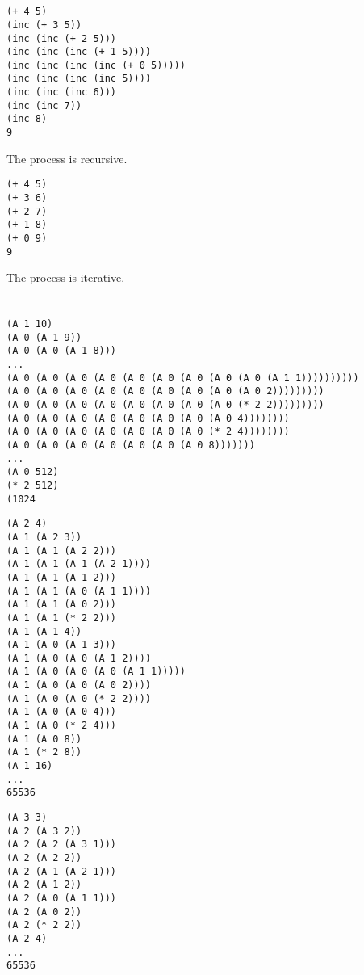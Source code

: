 \documentclass[../main.tex]{subfiles}
\begin{document}

\section{}

\begin{lstlisting}
(+ 4 5)
(inc (+ 3 5))
(inc (inc (+ 2 5)))
(inc (inc (inc (+ 1 5))))
(inc (inc (inc (inc (+ 0 5)))))
(inc (inc (inc (inc 5))))
(inc (inc (inc 6)))
(inc (inc 7))
(inc 8)
9
\end{lstlisting}

The process is recursive.

\begin{lstlisting}
(+ 4 5)
(+ 3 6)
(+ 2 7)
(+ 1 8)
(+ 0 9)
9
\end{lstlisting}

The process is iterative.


\section{}

\begin{lstlisting}
(A 1 10)
(A 0 (A 1 9))
(A 0 (A 0 (A 1 8)))
...
(A 0 (A 0 (A 0 (A 0 (A 0 (A 0 (A 0 (A 0 (A 0 (A 1 1))))))))))
(A 0 (A 0 (A 0 (A 0 (A 0 (A 0 (A 0 (A 0 (A 0 2)))))))))
(A 0 (A 0 (A 0 (A 0 (A 0 (A 0 (A 0 (A 0 (* 2 2)))))))))
(A 0 (A 0 (A 0 (A 0 (A 0 (A 0 (A 0 (A 0 4))))))))
(A 0 (A 0 (A 0 (A 0 (A 0 (A 0 (A 0 (* 2 4))))))))
(A 0 (A 0 (A 0 (A 0 (A 0 (A 0 (A 0 8)))))))
...
(A 0 512)
(* 2 512)
(1024
\end{lstlisting}

\begin{lstlisting}
(A 2 4)
(A 1 (A 2 3))
(A 1 (A 1 (A 2 2)))
(A 1 (A 1 (A 1 (A 2 1))))
(A 1 (A 1 (A 1 2)))
(A 1 (A 1 (A 0 (A 1 1))))
(A 1 (A 1 (A 0 2)))
(A 1 (A 1 (* 2 2)))
(A 1 (A 1 4))
(A 1 (A 0 (A 1 3)))
(A 1 (A 0 (A 0 (A 1 2))))
(A 1 (A 0 (A 0 (A 0 (A 1 1)))))
(A 1 (A 0 (A 0 (A 0 2))))
(A 1 (A 0 (A 0 (* 2 2))))
(A 1 (A 0 (A 0 4)))
(A 1 (A 0 (* 2 4)))
(A 1 (A 0 8))
(A 1 (* 2 8))
(A 1 16)
...
65536
\end{lstlisting}

\begin{lstlisting}
(A 3 3)
(A 2 (A 3 2))
(A 2 (A 2 (A 3 1)))
(A 2 (A 2 2))
(A 2 (A 1 (A 2 1)))
(A 2 (A 1 2))
(A 2 (A 0 (A 1 1)))
(A 2 (A 0 2))
(A 2 (* 2 2))
(A 2 4)
...
65536
\end{lstlisting}
\end{document}
